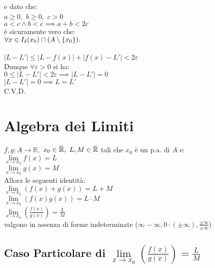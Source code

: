 \documentclass[a4paper, twoside, italian, 11pt]{book}
\newcommand{\braces}[1] {\left \{ #1 \right \}}
\newcommand{\abs}[1] {\left | #1 \right |}
\newcommand{\overbar}[1] {\mkern 1.5mu\overline{\mkern-1.5mu#1\mkern-1.5mu}\mkern 1.5mu}
\newcommand{\R}{\mathbb{R}}
\begin{document}
\noindent
e dato che: \\

$a \geq 0,$ $b \geq 0,$ $c > 0$ \\
\indent
$a < c \land b < c \implies a + b < 2c$ \\

\noindent
è sicuramente vero che: \\

$\forall x \in I_\delta(x_0) \cap (A \setminus \braces{x_0}) \ldotp$ \\\\
\indent
$\abs{L - L'} \leq \abs{L - f(x)} + \abs{f(x) - L'} < 2 \varepsilon$ \\

\noindent
Dunque $\forall \varepsilon > 0$ si ha: \\

$0 \leq \abs{L - L'} < 2 \varepsilon \implies \abs{L - L'} = 0$ \\
\indent
$\abs{L - L'} = 0 \implies L = L'$ \\

C.V.D.



\section{Algebra dei Limiti}

\noindent
$f, g : A \rightarrow \R,$ $x_0 \in \overbar\R,$ $L, M \in \overbar\R$ tali che $x_0$ è un p.a. di $A$ e: \\

\noindent
$\lim\limits_{x \to x_0} f(x) = L$ \\
$\lim\limits_{x \to x_0} g(x) = M$ \\

\noindent
Allora le seguenti identità: \\
$\lim\limits_{x \to x_0} (f(x) + g(x)) = L + M$ \\
$\lim\limits_{x \to x_0} (f(x) g(x)) = L \cdot M$ \\
$\lim\limits_{x \to x_0} (\frac{f(x)}{g(x)}) = \frac{L}{M}$ \\

\noindent
valgono in assenza di forme indeterminate ($\infty - \infty, 0 \cdot (\pm \infty), \frac{\pm \infty}{\pm \infty}$)


\subsection{Caso Particolare di $\lim\limits_{x \to x_0} (\frac{f(x)}{g(x)}) = \frac{L}{M}$}
\end{document}
